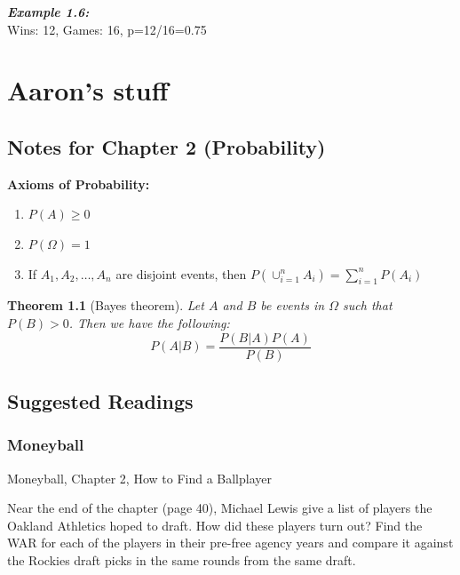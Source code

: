 \documentclass[
  11pt,
]{book}
\newtheorem{theorem}{Theorem}[chapter]
\theoremstyle{definition}
\theoremstyle{definition}
\theoremstyle{definition}
\theoremstyle{definition}
\theoremstyle{remark}
\begin{document}
\textbf{\emph{Example 1.6:}}\\
Wins: 12, Games: 16, p=12/16=0.75

\hypertarget{aarons-stuff}{%
\chapter{Aaron's stuff}\label{aarons-stuff}}

\hypertarget{notes-for-chapter-2-probability}{%
\section{Notes for Chapter 2 (Probability)}\label{notes-for-chapter-2-probability}}

\textbf{Axioms of Probability:}

\begin{enumerate}
\def\labelenumi{\arabic{enumi}.}
\item
  \(P(A) \geq 0\)
\item
  \(P(\Omega)=1\)
\item
  If \(A_1, A_2, \ldots, A_n\) are disjoint events, then \(P(\cup_{i=1}^n A_i) = \sum_{i=1}^n P(A_i)\)
\end{enumerate}

\begin{theorem}[Bayes theorem]
Let \(A\) and \(B\) be events in \(\Omega\) such that \(P(B)>0\). Then we have the following:
\[
P(A|B) = \frac{P(B|A)P(A)}{P(B)}
\]
\end{theorem}

\hypertarget{suggested-readings}{%
\section{Suggested Readings}\label{suggested-readings}}

\hypertarget{moneyball}{%
\subsection{Moneyball}\label{moneyball}}

Moneyball, Chapter 2, How to Find a Ballplayer \citep{lewis2004moneyball}

Near the end of the chapter (page 40), Michael Lewis give a list of players the Oakland Athletics hoped to draft. How did these players turn out? Find the WAR for each of the players in their pre-free agency years and compare it against the Rockies draft picks in the same rounds from the same draft.
\end{document}

